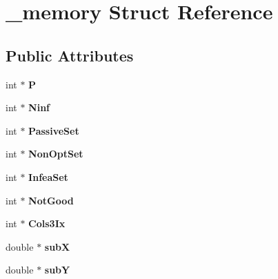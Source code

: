 \hypertarget{struct__memory}{\section{\-\_\-memory \-Struct \-Reference}
\label{struct__memory}
}
\subsection*{\-Public \-Attributes}
\begin{DoxyCompactItemize}
\item 
\hypertarget{struct__memory_a6ab5a8f32d4e12e0443ac4337f43341e}{int $\ast$ {\bfseries \-P}}\label{struct__memory_a6ab5a8f32d4e12e0443ac4337f43341e}

\item 
\hypertarget{struct__memory_a6683dbda37d282ab7b35d8453c2fe035}{int $\ast$ {\bfseries \-Ninf}}\label{struct__memory_a6683dbda37d282ab7b35d8453c2fe035}

\item 
\hypertarget{struct__memory_a6fa4b60e1942ed52218054f5e4d2eca2}{int $\ast$ {\bfseries \-Passive\-Set}}\label{struct__memory_a6fa4b60e1942ed52218054f5e4d2eca2}

\item 
\hypertarget{struct__memory_aa985c216bb82f1b2aee7bc690ac0445a}{int $\ast$ {\bfseries \-Non\-Opt\-Set}}\label{struct__memory_aa985c216bb82f1b2aee7bc690ac0445a}

\item 
\hypertarget{struct__memory_aff1c9e2ff70be48d97d3f8f76c35344d}{int $\ast$ {\bfseries \-Infea\-Set}}\label{struct__memory_aff1c9e2ff70be48d97d3f8f76c35344d}

\item 
\hypertarget{struct__memory_acf751b550e73e18732cbc5d4e0d92cf1}{int $\ast$ {\bfseries \-Not\-Good}}\label{struct__memory_acf751b550e73e18732cbc5d4e0d92cf1}

\item 
\hypertarget{struct__memory_a16e1949939ad48a55628f1ee905b8ca2}{int $\ast$ {\bfseries \-Cols3\-Ix}}\label{struct__memory_a16e1949939ad48a55628f1ee905b8ca2}

\item 
\hypertarget{struct__memory_a6c78ecc8a87ae746ce82f97b443bdc6b}{double $\ast$ {\bfseries sub\-X}}\label{struct__memory_a6c78ecc8a87ae746ce82f97b443bdc6b}

\item 
\hypertarget{struct__memory_ae663c9cd26ebb67f026930ad671da02b}{double $\ast$ {\bfseries sub\-Y}}\label{struct__memory_ae663c9cd26ebb67f026930ad671da02b}


\end{DoxyCompactItemize}
